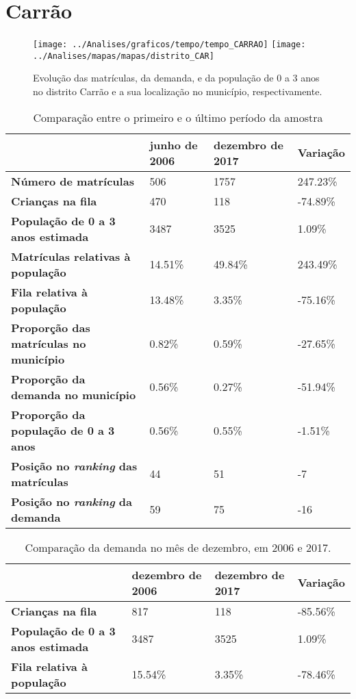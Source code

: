 \section{Carrão}
\begin{figure}[H]
	\centering
	\texttt{[image: ../Analises/graficos/tempo/tempo\_CARRAO]}
	\texttt{[image: ../Analises/mapas/mapas/distrito\_CAR]}
	\caption{Evolução das matrículas, da demanda, e da população de 0 a 3 anos no distrito Carrão e a sua localização no município, respectivamente.}
\end{figure}
\begin{table}[H]
	\begin{tabular}{|l|l|l|l|}
		\hline
		\textbf{}                                      & \textbf{junho de 2006}       & \textbf{dezembro de 2017}    & \textbf{Variação} \\ \hline
		\textbf{Número de matrículas}                  & 506 & 1757 & 247.23\% \\ \hline
		\textbf{Crianças na fila}                      & 470 & 118 & -74.89\% \\ \hline
		\textbf{População de 0 a 3 anos estimada}      & 3487 & 3525 & 1.09\% \\ \hline
		\textbf{Matrículas relativas à população}      & 14.51\% & 49.84\% & 243.49\% \\ \hline
		\textbf{Fila relativa à população}             & 13.48\% & 3.35\% & -75.16\% \\ \hline
		\textbf{Proporção das matrículas no município} & 0.82\% & 0.59\% & -27.65\% \\ \hline
		\textbf{Proporção da demanda no município}     & 0.56\% & 0.27\% & -51.94\% \\ \hline
		\textbf{Proporção da população de 0 a 3 anos}  & 0.56\% & 0.55\% & -1.51\% \\ \hline
		\textbf{Posição no \textit{ranking} das matrículas}     & 44 & 51 & -7 \\ \hline
		\textbf{Posição no \textit{ranking} da demanda}         & 59 & 75 & -16 \\ \hline
	\end{tabular}
	\caption{Comparação entre o primeiro e o último período da amostra}
\end{table}
\begin{table}[H]
	\begin{tabular}{|l|l|l|l|}
		\hline
		\textbf{}                                 & \textbf{dezembro de 2006} & \textbf{dezembro de 2017} & \textbf{Variação} \\ \hline
		\textbf{Crianças na fila}                      & 817 & 118 & -85.56\% \\ \hline
		\textbf{População de 0 a 3 anos estimada}      & 3487 & 3525 & 1.09\% \\ \hline
		\textbf{Fila relativa à população}             & 15.54\% & 3.35\% & -78.46\% \\ \hline
	\end{tabular}
	\caption{Comparação da demanda no mês de dezembro, em 2006 e 2017.}
\end{table}
